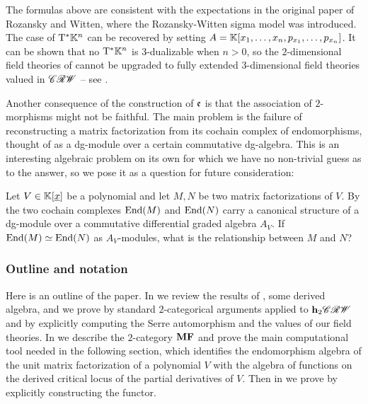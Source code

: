 The formulas above are consistent with the expectations in the original paper \cite{RW1997} of Rozansky and Witten, where the Rozansky-Witten sigma model was introduced. The case of $\mathrm{T}^\ast \mathbb{K}^n$ can be recovered by setting $A = \mathbb{K}[x_1, \dotsc, x_n, p_{x_1}, \dotsc, p_{x_n}]$. It can be shown that no $\mathrm{T}^\ast \mathbb{K}^{n}$ is $3$-dualizable when $n > 0$, so the $2$-dimensional field theories of  cannot be upgraded to fully extended $3$-dimensional field theories valued in $\mathscr{CRW}$ -- see .

Another consequence of the construction of $\mathfrak{e}$ is that the association of $2$-morphisms might not be faithful. The main problem is the failure of reconstructing a matrix factorization from its cochain complex of endomorphisms, thought of as a dg-module over a certain commutative dg-algebra. This is an interesting algebraic problem on its own for which we have no non-trivial guess as to the answer, so we pose it as a question for future consideration:
\begin{qst}
	Let $V \in \mathbb{K}[\underline{x}]$ be a polynomial and let $M, N$ be two matrix factorizations of $V$. By  the two cochain complexes $\mathrm{End}(M)$ and $\mathrm{End}(N)$ carry a canonical structure of a dg-module over a commutative differential graded algebra $A_{V}$. If $\mathrm{End}(M) \simeq \mathrm{End}(N)$ as $A_{V}$-modules, what is the relationship between $M$ and $N$?
\end{qst}

\subsubsection*{Outline and notation}

Here is an outline of the paper. In  we review the results of \cite{Riva2024}, some derived algebra, and we prove  by standard $2$-categorical arguments applied to $\mathbf{h}_2 \mathscr{CRW}$ and  by explicitly computing the Serre automorphism and the values of our field theories. In  we describe the $2$-category $\mathbf{MF}$ and prove the main computational tool needed in the following section, which identifies the endomorphism algebra of the unit matrix factorization of a polynomial $V$ with the algebra of functions on the derived critical locus of the partial derivatives of $V$. Then in  we prove  by explicitly constructing the functor. 

